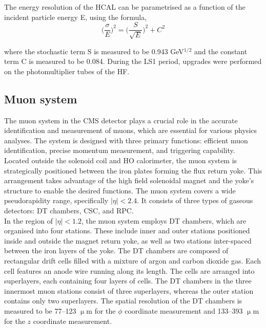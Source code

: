 The energy resolution of the \ac{HCAL} can be parametrised as a function of the incident particle energy E, using the formula, 
\begin{equation}
\Big(\frac{\sigma}{E}\Big)^2 = \Big(\frac{S}{\sqrt{E}}\Big)^2 + C^2
\end{equation}

where the stochastic term S is measured to be 0.943 GeV${^{1/2}}$ and the constant term C is measured to be 0.084.
During the \ac{LS1} period, upgrades were performed on the photomultiplier tubes of the \ac{HF}.

\subsection{Muon system}

The muon system in the \ac{CMS} detector plays a crucial role in the accurate identification and measurement of muons, which are essential for various physics analyses. 
The system is designed with three primary functions: efficient muon identification, precise momentum measurement, and triggering capability. \\

Located outside the solenoid coil and \ac{HO} calorimeter, the muon system is strategically positioned between the iron plates forming the flux return yoke. 
This arrangement takes advantage of the high field solenoidal magnet and the yoke's structure to enable the desired functions.
The muon system covers a wide pseudorapidity range, specifically $|\eta| < 2.4$. 
It consists of three types of gaseous detectors: \ac{DT} chambers, \ac{CSC}, and \ac{RPC}. \\

In the region of $|\eta| < 1.2$, the muon system employs \ac{DT} chambers, which are organised into four stations. 
These include inner and outer stations positioned inside and outside the magnet return yoke, as well as two stations inter-spaced between the iron layers of the yoke. 
The \ac{DT} chambers are composed of rectangular drift cells filled with a mixture of argon and carbon dioxide gas. 
Each cell features an anode wire running along its length. 
The cells are arranged into superlayers, each containing four layers of cells. 
The \ac{DT} chambers in the three innermost muon stations consist of three superlayers, whereas the outer station contains only two superlayers. 
The spatial resolution of the \ac{DT} chambers is measured to be 77–123 $\upmu$m for the $\phi$ coordinate measurement and 133–393 $\upmu$m for the $z$ coordinate measurement. \\

